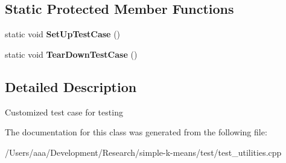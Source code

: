 \subsection*{Static Protected Member Functions}
\begin{DoxyCompactItemize}
\item 
\hypertarget{classUtilTest_ac0080980382f83fba5bdf4834196b21d}{static void {\bfseries Set\+Up\+Test\+Case} ()}\label{classUtilTest_ac0080980382f83fba5bdf4834196b21d}

\item 
\hypertarget{classUtilTest_a969e49f758a52c5385f812c55163cc6d}{static void {\bfseries Tear\+Down\+Test\+Case} ()}\label{classUtilTest_a969e49f758a52c5385f812c55163cc6d}

\end{DoxyCompactItemize}


\subsection{Detailed Description}
Customized test case for testing 

The documentation for this class was generated from the following file\+:\begin{DoxyCompactItemize}
\item 
/\+Users/aaa/\+Development/\+Research/simple-\/k-\/means/test/test\+\_\+utilities.\+cpp\end{DoxyCompactItemize}
